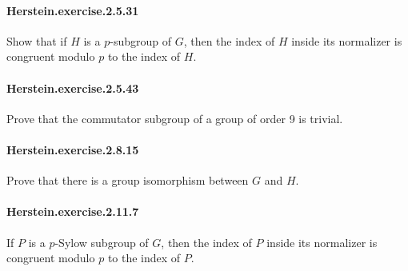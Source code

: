 \documentclass{article}
\begin{document}
\paragraph{Herstein.exercise.2.5.31} Show that if $H$ is a $p$-subgroup of $G$, then the index of $H$ inside its normalizer is congruent modulo $p$ to the index of $H$.

\paragraph{Herstein.exercise.2.5.43} Prove that the commutator subgroup of a group of order 9 is trivial.



\paragraph{Herstein.exercise.2.8.15} Prove that there is a group isomorphism between $G$ and $H$.


\paragraph{Herstein.exercise.2.11.7} If $P$ is a $p$-Sylow subgroup of $G$, then the index of $P$ inside its normalizer is congruent modulo $p$ to the index of $P$.

\end{document}
